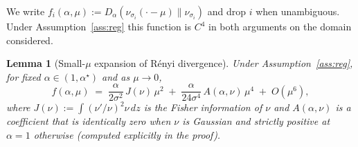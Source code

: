 \documentclass[11pt]{article}
\newtheorem{lemma}[theorem]{Lemma}
\theoremstyle{definition}
\begin{document}
We write $f_i(\alpha,\mu):=D_\alpha(\nu_{\sigma_i}(\cdot-\mu)\|\nu_{\sigma_i})$ and drop $i$ when unambiguous. Under Assumption~\ref{ass:reg} this function is $C^4$ in both arguments on the domain considered.

\begin{lemma}[Small-$\mu$ expansion of R\'enyi divergence]\label{lem:expansion}
Under Assumption~\ref{ass:reg}, for fixed $\alpha\in(1,\alpha^\star)$ and as $\mu\to 0$,
\[
f(\alpha,\mu)\;=\;\frac{\alpha}{2\sigma^2}\,J(\nu)\,\mu^2\;+\;\frac{\alpha}{24\sigma^4}\,A(\alpha,\nu)\,\mu^4\;+\;O(\mu^6),
\]
where $J(\nu):=\int (\nu'/\nu)^2\nu\,dz$ is the Fisher information of $\nu$ and $A(\alpha,\nu)$ is a coefficient that is identically zero when $\nu$ is Gaussian and strictly positive at $\alpha=1$ otherwise (computed explicitly in the proof).
\end{lemma}
\end{document}

